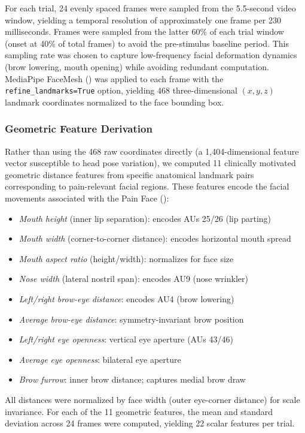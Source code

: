 \documentclass[10pt, twocolumn]{article}
\begin{document}
For each trial, 24 evenly spaced frames were sampled from the 5.5-second video window,
yielding a temporal resolution of approximately one frame per 230 milliseconds.
Frames were sampled from the latter 60\% of each trial window (onset at 40\% of
total frames) to avoid the pre-stimulus baseline period. This sampling rate was
chosen to capture low-frequency facial deformation dynamics (brow lowering, mouth
opening) while avoiding redundant computation. MediaPipe FaceMesh
(\cite{Lugaresi2019}) was applied to each frame with the \texttt{refine\_landmarks=True}
option, yielding 468 three-dimensional $(x, y, z)$ landmark coordinates normalized to the
face bounding box.

\subsubsection{Geometric Feature Derivation}

Rather than using the 468 raw coordinates directly (a 1,404-dimensional feature vector
susceptible to head pose variation), we computed 11 clinically motivated geometric distance
features from specific anatomical landmark pairs corresponding to pain-relevant facial
regions. These features encode the facial movements associated with the Pain Face
(\cite{Prkachin2008}):

\begin{itemize}
  \item \textit{Mouth height} (inner lip separation): encodes AUs 25/26 (lip parting)
  \item \textit{Mouth width} (corner-to-corner distance): encodes horizontal mouth spread
  \item \textit{Mouth aspect ratio} (height/width): normalizes for face size
  \item \textit{Nose width} (lateral nostril span): encodes AU9 (nose wrinkler)
  \item \textit{Left/right brow-eye distance}: encodes AU4 (brow lowering)
  \item \textit{Average brow-eye distance}: symmetry-invariant brow position
  \item \textit{Left/right eye openness}: vertical eye aperture (AUs 43/46)
  \item \textit{Average eye openness}: bilateral eye aperture
  \item \textit{Brow furrow}: inner brow distance; captures medial brow draw
\end{itemize}

All distances were normalized by face width (outer eye-corner distance) for scale
invariance. For each of the 11 geometric features, the mean and standard deviation across
24 frames were computed, yielding 22 scalar features per trial.
\end{document}
